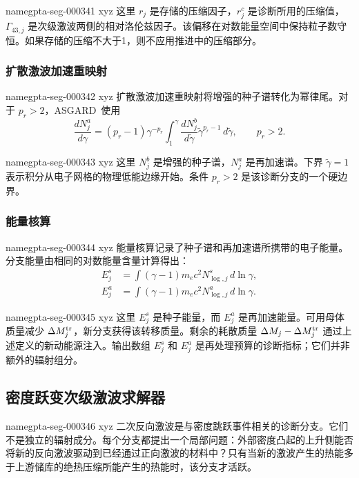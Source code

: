 \documentclass[twocolumn]{aastex702}
\makeatletter
\newcommand{\asgard}{\textsc{ASGARD}}
\providecommand{\gptareaderanchor}[1]{\pdfdest name{#1} xyz}%
\providecommand{\gptareaderanchor}[1]{\special{pdf:dest (#1) [ @thispage /XYZ @xpos @ypos null ]}}%
\makeatother
\begin{document}
\gptareaderanchor{gpta-seg-000341}%
这里 \(r_j\) 是存储的压缩因子，\(r_j^c\) 是诊断所用的压缩值，\(\Gamma_{43,j}\) 是次级激波两侧的相对洛伦兹因子。该偏移在对数能量空间中保持粒子数守恒。如果存储的压缩不大于1，则不应用推进中的压缩部分。

\subsubsection{扩散激波加速重映射}


\gptareaderanchor{gpta-seg-000342}%
扩散激波加速重映射将增强的种子谱转化为幂律尾。对于 \(p_r>2\)，\asgard\ 使用
\begin{equation}
\frac{dN_{j}^{a}}{d\gamma}
=(p_r-1)\gamma^{-p_r}
\int_1^\gamma
\frac{dN_j^{b}}{d\tilde\gamma}
\tilde\gamma^{p_r-1}\,d\tilde\gamma,
\qquad p_r>2 .
\end{equation}

\gptareaderanchor{gpta-seg-000343}%
这里 \(N_j^b\) 是增强的种子谱，\(N_j^a\) 是再加速谱。下界 \(\tilde\gamma=1\) 表示积分从电子网格的物理低能边缘开始。条件 \(p_r>2\) 是该诊断分支的一个硬边界。

\subsubsection{能量核算}


\gptareaderanchor{gpta-seg-000344}%
能量核算记录了种子谱和再加速谱所携带的电子能量。分支能量由相同的对数能量含量计算得出：
\begin{equation}
\begin{aligned}
E_j^{s}&=\int(\gamma-1)m_ec^2N_{\log,j}^{s}\,d\ln\gamma,\\
E_j^{a}&=\int(\gamma-1)m_ec^2N_{\log,j}^{a}\,d\ln\gamma .
\end{aligned}
\end{equation}

\gptareaderanchor{gpta-seg-000345}%
这里 \(E_j^s\) 是种子能量，而 \(E_j^a\) 是再加速能量。可用母体质量减少 \(\Delta M_j^{\rm tr}\)，新分支获得该转移质量。剩余的耗散质量 \(\Delta M_j-\Delta M_j^{\rm tr}\) 通过上述定义的新动能源注入。输出数组 \(E_j^s\) 和 \(E_j^a\) 是再处理预算的诊断指标；它们并非额外的辐射组分。

\subsection{密度跃变次级激波求解器}


\gptareaderanchor{gpta-seg-000346}%
二次反向激波是与密度跳跃事件相关的诊断分支。它们不是独立的辐射成分。每个分支都提出一个局部问题：外部密度凸起的上升侧能否将新的反向激波驱动到已经通过正向激波的材料中？只有当新的激波产生的热能多于上游储库的绝热压缩所能产生的热能时，该分支才活跃。
\end{document}

